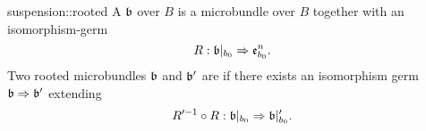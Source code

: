 \begin{mydefinition}{suspension::rooted}
    A  $\mathfrak{b}$ over $B$ is a microbundle
    over $B$ together with an isomorphism-germ
    \[ R: \mathfrak{b}\vert_{b_0} \Rightarrow{} \mathfrak{e}^{n}_{b_0}. \]
    Two rooted microbundles $\mathfrak{b}$ and $\mathfrak{b}'$ are 
    if there exists an isomorphism germ $\mathfrak{b} \Rightarrow{} \mathfrak{b}'$ extending
    \[ R'^{-1} \circ R: \mathfrak{b}\vert_{b_0} \Rightarrow{} \mathfrak{b}\vert_{b_0}'. \]
\end{mydefinition}